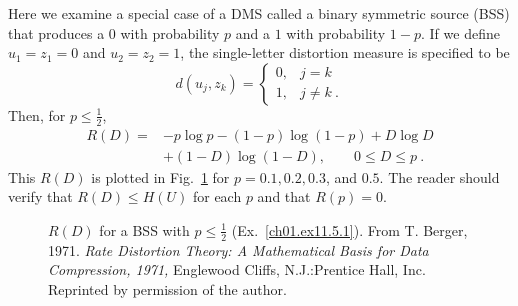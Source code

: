 \begin{example}
\label{ch01.ex11.5.1}
Here we examine a special case of a DMS called a binary symmetric
source (BSS) that produces a $0$ with probability $p$ and a
$1$ with probability $1-p$.
If we define $u_1 = z_1 = 0$ and $u_2 = z_2 = 1$,
the single-letter distortion measure is specified to be
\begin{equation}
        d \left( u_j, z_k \right) =
        \begin{cases}
         0,     & j = k   \\
         1,     & j \neq k~.
        \end{cases}
\label{ch01.eq11.5.7}
\end{equation}
Then, for $p \leq \tfrac{1}{2}$,
\begin{align}
        R(D)  =& - p \log p-(1-p) \log (1-p) + D \log D \nonumber       \\
               & + (1-D) \log (1-D), \qquad
                   0 \leq D \leq p~.
\label{ch01.eq11.5.8}
\end{align}
This $R(D)$ is plotted in Fig.~\ref{ch01.fig11.5.1} for
$p=0.1, 0.2, 0.3$, and $0.5$.
The reader should verify that $R(D) \leq H(U)$ for each $p$
and that $R(p) = 0$.

\begin{figure}[hbt] %
 \figboxes
\caption{$R(D)$ for a BSS with $p \leq \tfrac{1}{2}$
 (Ex.~\protect\ref{ch01.ex11.5.1}).
 From T. Berger, 1971. \textit{Rate Distortion Theory: A Mathematical
 Basis for Data Compression, 1971,} Englewood Cliffs, N.J.:Prentice
 Hall, Inc. Reprinted by permission of the author.
\label{ch01.fig11.5.1} }
\end{figure}


\end{example}
